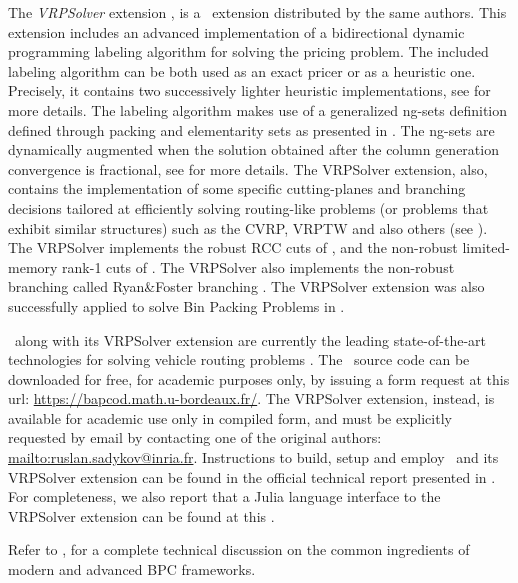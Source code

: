 The \textit{VRPSolver} extension \parencite{pessoa2020a}, is
a \bapcod\ extension distributed by the same authors.
This extension includes an
advanced implementation of a bidirectional dynamic programming labeling algorithm
\parencite{sadykov2021bucket} for solving the pricing problem.
The included labeling algorithm
can be both used as an exact pricer or as a heuristic one.
Precisely, it contains two successively lighter heuristic implementations,
see \textcite{sadykov2021bucket} for more details.
The labeling algorithm makes use of a generalized ng-sets definition \parencite{baldacci2011}
defined through packing and elementarity sets as presented in \textcite{pessoa2020a}.
The ng-sets are dynamically augmented \parencite{roberti2014}
when the solution obtained after the column generation convergence
is fractional,
see \textcite{pessoa2020a} for more details.
The VRPSolver extension, also,
contains the implementation of some
specific cutting-planes and branching decisions
tailored at efficiently solving routing-like problems
(or problems that exhibit similar structures)
such as the CVRP, VRPTW and also others (see \cite{pessoa2020a}).
The VRPSolver implements the robust RCC cuts of \textcite{laporte1983},
and the non-robust limited-memory rank-1 cuts of \textcite{pecin2017}.
The VRPSolver also implements the non-robust branching called Ryan\&Foster branching \parencite{ryan1981}.
The VRPSolver extension was also successfully applied
to solve Bin Packing Problems in \textcite{pessoa2020}.

\medskip

\bapcod\ along with its VRPSolver extension are currently the leading state-of-the-art
technologies for solving vehicle routing problems \parencite{pessoa2020a}.
The \bapcod\ source code can be downloaded for free, for academic purposes only,
by issuing a form request at this url: \url{https://bapcod.math.u-bordeaux.fr/}.
The VRPSolver extension, instead, is available for academic use only in compiled form,
and must be explicitly requested by email by contacting one of the
original authors: \url{mailto:ruslan.sadykov@inria.fr}.
Instructions to build, setup and employ \bapcod\ and its VRPSolver extension
can be found in the official technical report presented in \textcite{sadykov2021}.
For completeness, we also report that
a Julia language interface to the VRPSolver extension
can be found at this
.

Refer to \textcite{sadykov2019b},
for a complete technical discussion on the common ingredients of modern and advanced BPC frameworks.

